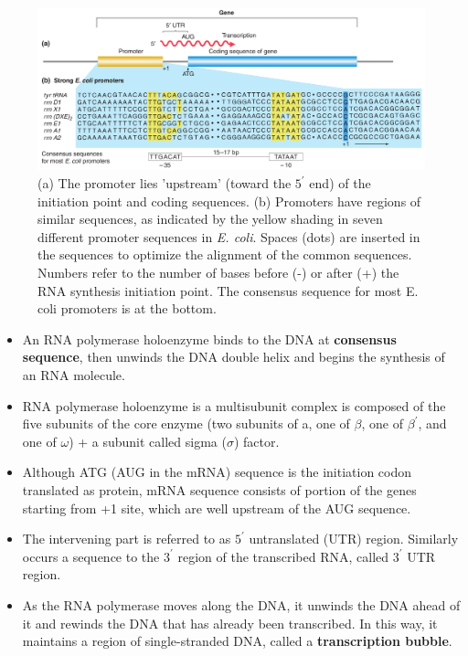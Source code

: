 \documentclass[11pt,ignorenonframetext,aspectratio=169]{beamer}
\providecommand{\tightlist}{%
  \setlength{\itemsep}{0pt}\setlength{\parskip}{0pt}}
\begin{document}
\begin{frame}{}
\protect\hypertarget{section-16}{}

\begin{figure}
\includegraphics[width=0.65\linewidth]{../images/gene_transcription} \caption{(a) The promoter lies 'upstream' (toward the $5^\prime$ end) of the initiation point and coding sequences. (b) Promoters have regions of similar sequences, as indicated by the yellow shading in seven different promoter sequences in \textit{E. coli}. Spaces (dots) are inserted in the sequences to optimize the alignment of the common sequences. Numbers refer to the number of bases before (-) or after (+) the RNA synthesis initiation point. The consensus sequence for most E. coli promoters is at the bottom.}\label{fig:gene-transcription}
\end{figure}

\end{frame}

\begin{frame}{}
\protect\hypertarget{section-17}{}

\begin{itemize}
\tightlist
\item
  An RNA polymerase holoenzyme binds to the DNA at \textbf{consensus
  sequence}, then unwinds the DNA double helix and begins the synthesis
  of an RNA molecule.
\item
  RNA polymerase holoenzyme is a multisubunit complex is composed of the
  five subunits of the core enzyme (two subunits of a, one of \(\beta\),
  one of \(\beta^\prime\), and one of \(\omega\)) + a subunit called
  sigma (\(\sigma\)) factor.
\item
  Although ATG (AUG in the mRNA) sequence is the initiation codon
  translated as protein, mRNA sequence consists of portion of the genes
  starting from +1 site, which are well upstream of the AUG sequence.
\item
  The intervening part is referred to as \(5^\prime\) untranslated (UTR)
  region. Similarly occurs a sequence to the \(3^\prime\) region of the
  transcribed RNA, called \(3^\prime\) UTR region.
\item
  As the RNA polymerase moves along the DNA, it unwinds the DNA ahead of
  it and rewinds the DNA that has already been transcribed. In this way,
  it maintains a region of single-stranded DNA, called a
  \textbf{transcription bubble}.
\end{itemize}

\end{frame}
\end{document}
